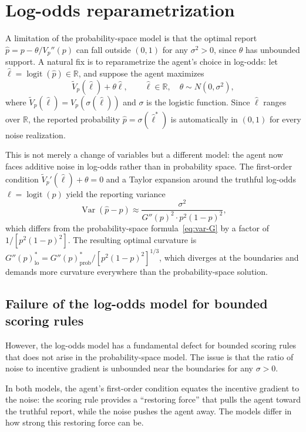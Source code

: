 \documentclass[11pt]{article}
\begin{document}
\section{Log-odds reparametrization}\label{sec:logodds}

A limitation of the probability-space model is that the optimal report $\hat{p} = p - \theta / V_p''(p)$ can fall outside $(0,1)$ for any $\sigma^2 > 0$, since $\theta$ has unbounded support. A natural fix is to reparametrize the agent's choice in log-odds: let $\hat{\ell} = \operatorname{logit}(\hat{p}) \in \mathbb{R}$, and suppose the agent maximizes
\[
\tilde{V}_p(\hat{\ell}) + \theta \hat{\ell}, \qquad \hat{\ell} \in \mathbb{R}, \quad \theta \sim N(0, \sigma^2),
\]
where $\tilde{V}_p(\hat{\ell}) = V_p(\sigma(\hat{\ell}))$ and $\sigma$ is the logistic function. Since $\hat{\ell}$ ranges over $\mathbb{R}$, the reported probability $\hat{p} = \sigma(\hat{\ell}^*)$ is automatically in $(0,1)$ for every noise realization.

This is not merely a change of variables but a different model: the agent now faces additive noise in log-odds rather than in probability space. The first-order condition $\tilde{V}_p'(\hat{\ell}) + \theta = 0$ and a Taylor expansion around the truthful log-odds $\ell = \operatorname{logit}(p)$ yield the reporting variance
\begin{equation}\label{eq:var-logodds-summary}
\operatorname{Var}(\hat{p} - p) \approx \frac{\sigma^2}{G''(p)^2 \cdot p^2(1-p)^2},
\end{equation}
which differs from the probability-space formula~\eqref{eq:var-G} by a factor of $1/[p^2(1-p)^2]$. The resulting optimal curvature is $G''(p)^*_{\text{lo}} = G''(p)^*_{\text{prob}} / [p^2(1-p)^2]^{1/3}$, which diverges at the boundaries and demands more curvature everywhere than the probability-space solution.

\subsection{Failure of the log-odds model for bounded scoring rules}

However, the log-odds model has a fundamental defect for bounded scoring rules that does not arise in the probability-space model. The issue is that the ratio of noise to incentive gradient is unbounded near the boundaries for any $\sigma > 0$.

In both models, the agent's first-order condition equates the incentive gradient to the noise: the scoring rule provides a ``restoring force'' that pulls the agent toward the truthful report, while the noise pushes the agent away. The models differ in how strong this restoring force can be.
\end{document}
